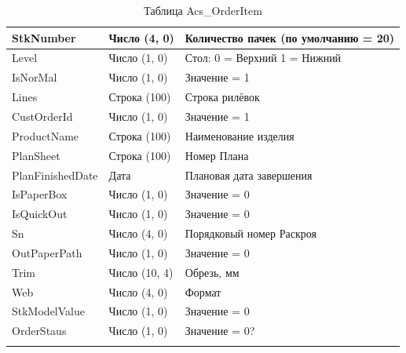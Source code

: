 \begin{longtable}{|p{56mm}|p{56mm}|p{56mm}|}
\hline
\parbox[c][10mm]{56mm}{StkNumber} & \parbox{56mm}{Число (4, 0)} & \parbox{56mm}{Количество пачек (по умолчанию = 20)} \\
\hline
\parbox[c][15mm]{56mm}{Level} & \parbox{56mm}{Число (1, 0)} & \parbox{56mm}{Стол: 0 = Верхний 1 = Нижний} \\
\hline
\parbox[c][5mm]{56mm}{IsNorMal} & \parbox{56mm}{Число (1, 0)} & \parbox{56mm}{Значение = 1} \\
\hline
\parbox[c][5mm]{56mm}{Lines} & \parbox{56mm}{Строка (100)} & \parbox{56mm}{Строка рилёвок} \\
\hline
\parbox[c][5mm]{56mm}{CustOrderId} & \parbox{56mm}{Число (1, 0)} & \parbox{56mm}{Значение = 1} \\
\hline
\parbox[c][5mm]{56mm}{ProductName} & \parbox{56mm}{Строка (100)} & \parbox{56mm}{Наименование изделия} \\
\hline
\parbox[c][5mm]{56mm}{PlanSheet} & \parbox{56mm}{Строка (100)} & \parbox{56mm}{Номер Плана} \\
\hline
\parbox[c][5mm]{56mm}{PlanFinishedDate} & \parbox{56mm}{Дата} & \parbox{56mm}{Плановая дата завершения} \\
\hline
\parbox[c][5mm]{56mm}{IsPaperBox} & \parbox{56mm}{Число (1, 0)} & \parbox{56mm}{Значение = 0} \\
\hline
\parbox[c][5mm]{56mm}{IsQuickOut} & \parbox{56mm}{Число (1, 0)} & \parbox{56mm}{Значение = 0} \\
\hline
\parbox[c][5mm]{56mm}{Sn} & \parbox{56mm}{Число (4, 0)} & \parbox{56mm}{Порядковый номер Раскроя} \\
\hline
\parbox[c][5mm]{56mm}{OutPaperPath} & \parbox{56mm}{Число (1, 0)} & \parbox{56mm}{Значение = 0} \\
\hline
\parbox[c][5mm]{56mm}{Trim} & \parbox{56mm}{Число (10, 4)} & \parbox{56mm}{Обрезь, мм} \\
\hline
\parbox[c][5mm]{56mm}{Web} & \parbox{56mm}{Число (4, 0)} & \parbox{56mm}{Формат} \\
\hline
\parbox[c][5mm]{56mm}{StkModelValue} & \parbox{56mm}{Число (1, 0)} & \parbox{56mm}{Значение = 0} \\
\hline
\parbox[c][5mm]{56mm}{OrderStaus} & \parbox{56mm}{Число (1, 0)} & \parbox{56mm}{Значение = 0?} \\
\hline
\caption{Таблица Acs\_OrderItem}\label{tab:Acs_OrderItem}
\end{longtable}  
\normalsize





